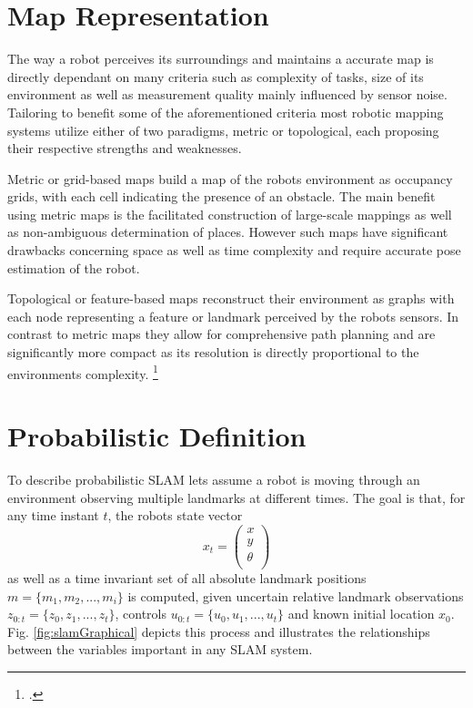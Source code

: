 \section{Map Representation}
The way a robot perceives its surroundings and maintains a accurate map is directly dependant on many criteria such as complexity of tasks, size of its environment as well as measurement quality mainly influenced by sensor noise. 
Tailoring to benefit some of the aforementioned criteria most robotic mapping systems utilize either of two paradigms, metric or topological, each proposing their respective strengths and weaknesses.

Metric or grid-based maps build a map of the robots environment as occupancy grids, with each cell indicating the presence of an obstacle. The main benefit using metric maps is the facilitated construction of large-scale mappings as well as non-ambiguous determination of places. However such maps have significant drawbacks concerning space as well as time complexity and require accurate pose estimation of the robot.

Topological or feature-based maps reconstruct their environment as graphs with each node representing a feature or landmark perceived by the robots sensors. In contrast to metric maps they allow for comprehensive path planning and are significantly more compact as its resolution is directly proportional to the environments complexity. \footcite{thrunMaps1998}


\section{Probabilistic Definition}
To describe probabilistic SLAM lets assume a robot is moving through an environment observing multiple landmarks at different times. 
The goal is that, for any time instant $ t $, the robots state vector 
\[ x_{t} = 
\begin{pmatrix}
	x \\
	y \\
	\theta \\
\end{pmatrix}
\] as well as a time invariant set of all absolute landmark positions 
$ m = \{ m_{1}, m_{2}, ..., m_{i} \}$ 
is computed, given uncertain relative landmark observations $ z_{0:t} = \{z_{0}, z_{1}, ..., z_{t}\}$, controls $ u_{0:t} = \{u_{0}, u_{1}, ..., u_{t}\}$ and known initial location $ x_{0} $. Fig. \ref{fig:slamGraphical} depicts this process and illustrates the relationships between the variables important in any SLAM system. 

